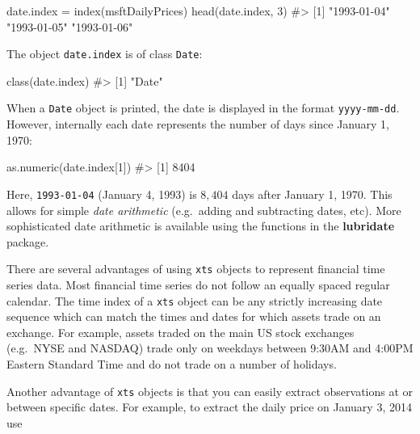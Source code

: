\documentclass[
  letterpaper,
  DIV=11,
  numbers=noendperiod]{scrreprt}
\newenvironment{Shaded}{\begin{snugshade}}{\end{snugshade}}
\newcommand{\CommentTok}[1]{\textcolor[rgb]{0.37,0.37,0.37}{#1}}
\newcommand{\DecValTok}[1]{\textcolor[rgb]{0.68,0.00,0.00}{#1}}
\newcommand{\FunctionTok}[1]{\textcolor[rgb]{0.28,0.35,0.67}{#1}}
\newcommand{\NormalTok}[1]{\textcolor[rgb]{0.00,0.23,0.31}{#1}}
\newcommand{\OtherTok}[1]{\textcolor[rgb]{0.00,0.23,0.31}{#1}}
\theoremstyle{definition}
\theoremstyle{definition}
\theoremstyle{remark}
\begin{document}
\begin{Shaded}
\begin{Highlighting}[]
\NormalTok{date.index }\OtherTok{=} \FunctionTok{index}\NormalTok{(msftDailyPrices)}
\FunctionTok{head}\NormalTok{(date.index, }\DecValTok{3}\NormalTok{)}
\CommentTok{\#\textgreater{} [1] "1993{-}01{-}04" "1993{-}01{-}05" "1993{-}01{-}06"}
\end{Highlighting}
\end{Shaded}

The object \texttt{date.index} is of class \texttt{Date}:

\begin{Shaded}
\begin{Highlighting}[]
\FunctionTok{class}\NormalTok{(date.index)}
\CommentTok{\#\textgreater{} [1] "Date"}
\end{Highlighting}
\end{Shaded}

When a \texttt{Date} object is printed, the date is displayed in the
format \texttt{yyyy-mm-dd}. However, internally each date represents the
number of days since January 1, 1970:

\begin{Shaded}
\begin{Highlighting}[]
\FunctionTok{as.numeric}\NormalTok{(date.index[}\DecValTok{1}\NormalTok{])}
\CommentTok{\#\textgreater{} [1] 8404}
\end{Highlighting}
\end{Shaded}

Here, \texttt{1993-01-04} (January 4, 1993) is \(8,404\) days after
January 1, 1970. This allows for simple \emph{date arithmetic}
(e.g.~adding and subtracting dates, etc). More sophisticated date
arithmetic is available using the functions in the \textbf{lubridate}
package.

There are several advantages of using \texttt{xts} objects to represent
financial time series data. Most financial time series do not follow an
equally spaced regular calendar. The time index of a \texttt{xts} object
can be any strictly increasing date sequence which can match the times
and dates for which assets trade on an exchange. For example, assets
traded on the main US stock exchanges (e.g.~NYSE and NASDAQ) trade only
on weekdays between 9:30AM and 4:00PM Eastern Standard Time and do not
trade on a number of holidays.

Another advantage of \texttt{xts} objects is that you can easily extract
observations at or between specific dates. For example, to extract the
daily price on January 3, 2014 use
\end{document}
